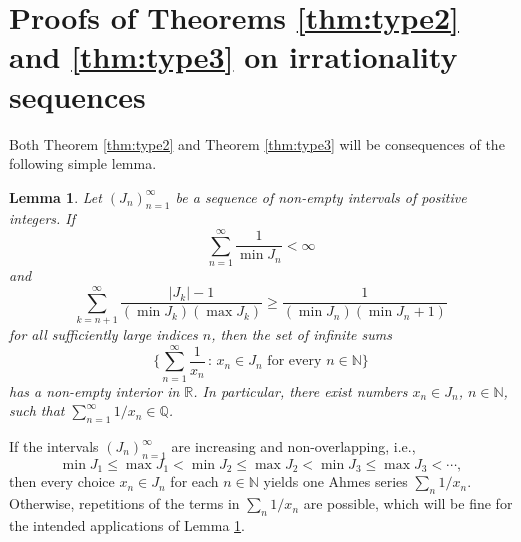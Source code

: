 \documentclass[11pt,letterpaper,reqno]{amsart}
\numberwithin{equation}{section}
\newtheorem{lemma}[theorem]{Lemma}
\theoremstyle{definition}
\numberwithin{equation}{section}
\begin{document}

\section{Proofs of Theorems \ref{thm:type2} and \ref{thm:type3} on irrationality sequences}

Both Theorem \ref{thm:type2} and Theorem \ref{thm:type3} will be consequences of the following simple lemma.

\begin{lemma}\label{lm:1D}
Let $(J_n)_{n=1}^{\infty}$ be a sequence of non-empty intervals of positive integers.
If
\[ \sum_{n=1}^{\infty} \frac{1}{\min J_n} < \infty \]
and
\begin{equation}\label{eq:lJ1Dassume}
\sum_{k=n+1}^{\infty} \frac{|J_k|-1}{(\min J_k)(\max J_k)} \geqslant \frac{1}{(\min J_n)(\min J_n+1)}
\end{equation}
for all sufficiently large indices $n$, then the set of infinite sums
\begin{equation}\label{eq:theperturbed1D}
\biggl\{ \sum_{n=1}^{\infty}\frac{1}{x_n} \,:\, x_n\in J_n \text{ for every } n\in\mathbb{N} \biggr\}
\end{equation}
has a non-empty interior in $\mathbb{R}$.
In particular, there exist numbers $x_n\in J_n$, $n\in\mathbb{N}$, such that $\sum_{n=1}^{\infty} 1/x_n \in\mathbb{Q}$.
\end{lemma}

If the intervals $(J_n)_{n=1}^{\infty}$ are increasing and non-overlapping, i.e.,
\[ \min J_1 \leqslant \max J_1 < \min J_2 \leqslant \max J_2 < \min J_3 \leqslant \max J_3 < \cdots, \]
then every choice $x_n\in J_n$ for each $n\in\mathbb{N}$ yields one Ahmes series $\sum_n 1/x_n$.
Otherwise, repetitions of the terms in $\sum_n 1/x_n$ are possible, which will be fine for the intended applications of Lemma \ref{lm:1D}.
\end{document}
